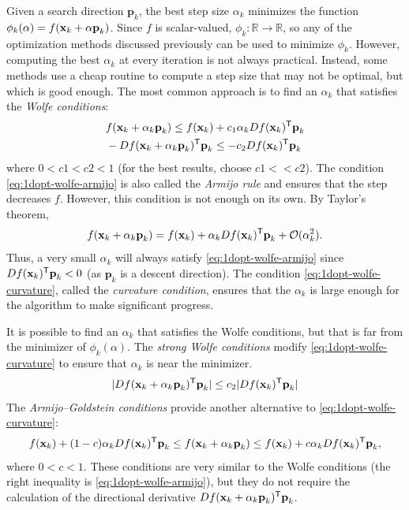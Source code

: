 Given a search direction $\textbf{p}_k$, the best step size $\alpha_k$ minimizes the function $\phi_k(\alpha) = f(\mathbf{x}_k + \alpha\textbf{p}_k)$.
Since $f$ is scalar-valued, $\phi_k:\mathbb{R}\rightarrow\mathbb{R}$, so any of the optimization methods discussed previously can be used to minimize $\phi_k$.
However, computing the best $\alpha_k$ at every iteration is not always practical.
Instead, some methods use a cheap routine to compute a step size that may not be optimal, but which is good enough.
The most common approach is to find an $\alpha_k$ that satisfies the \emph{Wolfe conditions}:
\begin{align}
&f(\textbf{x}_k + \alpha_k \textbf{p}_k) \leq f(\textbf{x}_k) + c_1\alpha_k Df(\textbf{x}_k)^{\mathsf T} \textbf{p}_k
\label{eq:1dopt-wolfe-armijo}
\\
& - Df(\textbf{x}_k + \alpha_k \textbf{p}_k)^{\mathsf T} \textbf{p}_k \leq -c_2 Df(\textbf{x}_k)^{\mathsf T} \textbf{p}_k
\label{eq:1dopt-wolfe-curvature}
\end{align}
where $0 < c1 < c2 < 1$ (for the  best results, choose $c1 << c2$).
The condition \eqref{eq:1dopt-wolfe-armijo} is also called the \emph{Armijo rule} and ensures that the step decreases $f$.
However, this condition is not enough on its own.
By Taylor's theorem,
\[
f(\textbf{x}_k + \alpha_k \textbf{p}_k) = f(\textbf{x}_k) + \alpha_k Df(\textbf{x}_k)^{\mathsf T} \textbf{p}_k + \mathcal{O}(\alpha_k^2).
\]
Thus, a very small $\alpha_k$ will always satisfy \eqref{eq:1dopt-wolfe-armijo} since $Df(\textbf{x}_k)^{\mathsf T}\textbf{p}_k < 0$ (as $\textbf{p}_k$ is a descent direction).
The condition \eqref{eq:1dopt-wolfe-curvature}, called the \emph{curvature condition}, ensures that the $\alpha_k$ is large enough for the algorithm to make significant progress.

It is possible to find an $\alpha_k$ that satisfies the Wolfe conditions, but that is far from the minimizer of $\phi_k(\alpha)$.
The \emph{strong Wolfe conditions} modify \eqref{eq:1dopt-wolfe-curvature} to ensure that $\alpha_k$ is near the minimizer.
\[
| Df(\textbf{x}_k + \alpha_k \textbf{p}_k)^{\mathsf T} \textbf{p}_k| \leq c_2| Df(\textbf{x}_k)^{\mathsf T} \textbf{p}_k|
\]
The \emph{Armijo--Goldstein conditions} provide another alternative to \eqref{eq:1dopt-wolfe-curvature}:
\[
f(\textbf{x}_k) + (1 - c)\alpha_k Df(\textbf{x}_k)^{\mathsf T} \textbf{p}_k \leq f(\textbf{x}_k + \alpha_k\textbf{p}_k) \leq f(\textbf{x}_k) + c\alpha_k Df(\textbf{x}_k)^{\mathsf T}\textbf{p}_k,
\]
where $0 < c < 1$.
These conditions are very similar to the Wolfe conditions (the right inequality is \eqref{eq:1dopt-wolfe-armijo}), but they do not require the calculation of the directional derivative $ Df(\textbf{x}_k + \alpha_k \textbf{p}_k)^{\mathsf T}\textbf{p}_k$.

